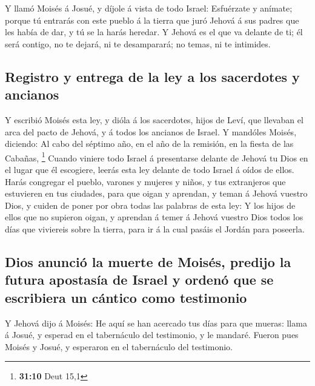  Y llamó Moisés á Josué, y díjole á vista de todo Israel:
Esfuérzate y anímate; porque tú entrarás con este pueblo á la tierra que
juró Jehová á sus padres que les había de dar, y tú se la harás heredar.
 Y Jehová es el que va delante de ti; él será contigo, no te
dejará, ni te desamparará; no temas, ni te intimides.

\hypertarget{registro-y-entrega-de-la-ley-a-los-sacerdotes-y-ancianos}{%
\subsection{Registro y entrega de la ley a los sacerdotes y
ancianos}\label{registro-y-entrega-de-la-ley-a-los-sacerdotes-y-ancianos}}

 Y escribió Moisés esta ley, y dióla á los sacerdotes, hijos
de Leví, que llevaban el arca del pacto de Jehová, y á todos los
ancianos de Israel.  Y mandóles Moisés, diciendo: Al cabo
del séptimo año, en el año de la remisión, en la fiesta de las Cabañas,
\footnote{\textbf{31:10} Deut 15,1}  Cuando viniere todo
Israel á presentarse delante de Jehová tu Dios en el lugar que él
escogiere, leerás esta ley delante de todo Israel á oídos de ellos.
 Harás congregar el pueblo, varones y mujeres y niños, y
tus extranjeros que estuvieren en tus ciudades, para que oigan y
aprendan, y teman á Jehová vuestro Dios, y cuiden de poner por obra
todas las palabras de esta ley:  Y los hijos de ellos que
no supieron oigan, y aprendan á temer á Jehová vuestro Dios todos los
días que viviereis sobre la tierra, para ir á la cual pasáis el Jordán
para poseerla.

\hypertarget{dios-anunciuxf3-la-muerte-de-moisuxe9s-predijo-la-futura-apostasuxeda-de-israel-y-ordenuxf3-que-se-escribiera-un-cuxe1ntico-como-testimonio}{%
\subsection{Dios anunció la muerte de Moisés, predijo la futura
apostasía de Israel y ordenó que se escribiera un cántico como
testimonio}\label{dios-anunciuxf3-la-muerte-de-moisuxe9s-predijo-la-futura-apostasuxeda-de-israel-y-ordenuxf3-que-se-escribiera-un-cuxe1ntico-como-testimonio}}

 Y Jehová dijo á Moisés: He aquí se han acercado tus días
para que mueras: llama á Josué, y esperad en el tabernáculo del
testimonio, y le mandaré. Fueron pues Moisés y Josué, y esperaron en el
tabernáculo del testimonio.

